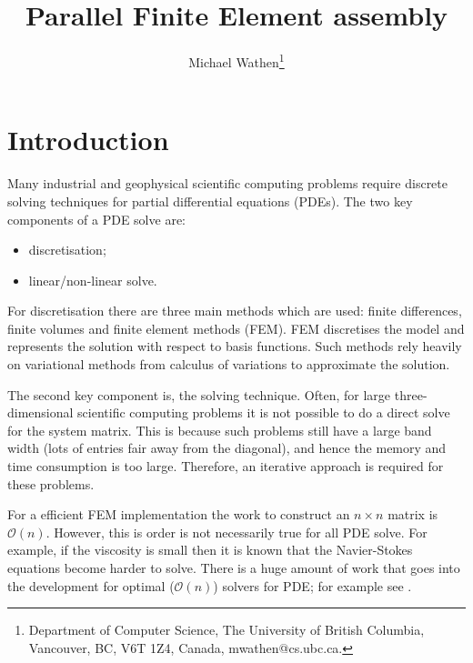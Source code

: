 \documentclass[11pt]{article}
\title{Parallel Finite Element assembly}
\author{
 Michael Wathen\thanks{Department of Computer Science,
The University of British Columbia, Vancouver, BC, V6T 1Z4, Canada,
 mwathen@cs.ubc.ca.}
}
\begin{document}
\maketitle





\section{Introduction}

Many industrial and geophysical scientific computing problems require discrete solving techniques for partial differential equations (PDEs). The two key components of a PDE solve are:
\begin{itemize}
    \item discretisation;
    \item linear/non-linear solve.
\end{itemize}
For discretisation there are three main methods which are used: finite differences, finite volumes and finite element methods (FEM). FEM discretises the model and represents the solution with respect to basis functions. Such methods rely heavily on variational methods from calculus of variations to approximate the solution.

The second key component is, the solving technique. Often, for large three-dimensional scientific computing problems it is not possible to do a direct solve for the system matrix. This is because such problems still have a large band width (lots of entries fair away from the diagonal), and hence the memory and time consumption is too large. Therefore, an iterative approach is required for these problems.

For a efficient FEM implementation the work to construct an $n\times n$ matrix is $\mathcal{O}(n)$. However, this is order is not necessarily true for all PDE solve. For example, if the viscosity is small then it is known that the Navier-Stokes equations become harder to solve. There is a huge amount of work that goes into the development for optimal ($\mathcal{O}(n)$) solvers for PDE; for example see \cite{bosch2014fast,elman2014finite,greif2007preconditioners,phillips2014block}.
\end{document}
